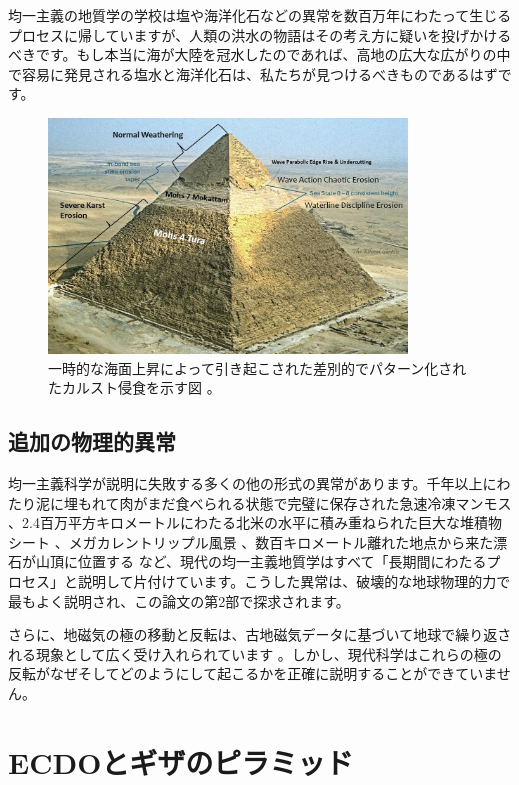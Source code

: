 \documentclass[10pt,twocolumn,letterpaper]{article}
\begin{document}
均一主義の地質学の学校は塩や海洋化石などの異常を数百万年にわたって生じるプロセスに帰していますが、人類の洪水の物語はその考え方に疑いを投げかけるべきです。もし本当に海が大陸を冠水したのであれば、高地の広大な広がりの中で容易に発見される塩水と海洋化石は、私たちが見つけるべきものであるはずです。

\begin{figure}[t]
\begin{center}
\includegraphics[width=0.85\textwidth]{khafre.jpg}
\end{center}
   \caption{一時的な海面上昇によって引き起こされた差別的でパターン化されたカルスト侵食を示す図 \cite{27}。}
\label{fig:4}
\end{figure}

\subsection{追加の物理的異常}

均一主義科学が説明に失敗する多くの他の形式の異常があります。千年以上にわたり泥に埋もれて肉がまだ食べられる状態で完璧に保存された急速冷凍マンモス \cite{17,18,19}、2.4百万平方キロメートルにわたる北米の水平に積み重ねられた巨大な堆積物シート \cite{21}、メガカレントリップル風景 \cite{22}、数百キロメートル離れた地点から来た漂石が山頂に位置する \cite{23,26}など、現代の均一主義地質学はすべて「長期間にわたるプロセス」と説明して片付けています。こうした異常は、破壊的な地球物理的力で最もよく説明され、この論文の第2部で探求されます。

さらに、地磁気の極の移動と反転は、古地磁気データに基づいて地球で繰り返される現象として広く受け入れられています \cite{35,40,41}。しかし、現代科学はこれらの極の反転がなぜそしてどのようにして起こるかを正確に説明することができていません。

\section{ECDOとギザのピラミッド}
\end{document}
